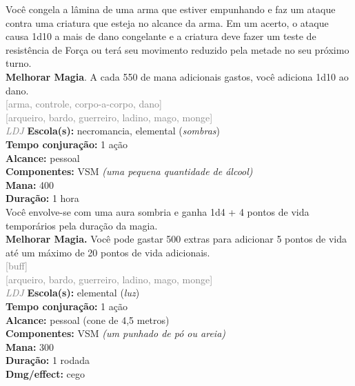 \documentclass{RPG_Adventure}[2021/10/20]
\begin{document}
{\normalsize Você congela a lâmina de uma arma que estiver empunhando e faz um ataque contra uma criatura que esteja no alcance da arma. Em um acerto, o ataque causa 1d10 a mais de dano congelante e a criatura deve fazer um teste de resistência de Força ou terá seu movimento reduzido pela metade no seu próximo turno.\\\t \textbf{Melhorar Magia}. A cada 550 de mana adicionais gastos, você adiciona 1d10 ao dano.\\}
{\scriptsize \textcolor{gray}{[arma, controle, corpo-a-corpo, dano]\\}}
{\scriptsize \textcolor{gray}{[arqueiro, bardo, guerreiro, ladino, mago, monge]\\}}
{\tiny \textcolor{gray}{\textit{LDJ}}}
{\small \t \textbf{Escola(s):} necromancia, elemental (\textit{sombras})\\\t \textbf{Tempo conjuração:} 1 ação\\\t \textbf{Alcance:} pessoal\\\t \textbf{Componentes:} VSM \textit{(uma pequena quantidade de álcool)}\\\t \textbf{Mana:} 400\\\t \textbf{Duração:} 1 hora\\}
{\normalsize Você envolve-se com uma aura sombria e ganha 1d4 + 4 pontos de vida temporários pela duração da magia.\\\t \textbf{Melhorar Magia.} Você pode gastar 500 extras para adicionar 5 pontos de vida até um máximo de 20 pontos de vida adicionais.\\}
{\scriptsize \textcolor{gray}{[buff]\\}}
{\scriptsize \textcolor{gray}{[arqueiro, bardo, guerreiro, ladino, mago, monge]\\}}
{\tiny \textcolor{gray}{\textit{LDJ}}}
{\small \t \textbf{Escola(s):} elemental (\textit{luz})\\\t \textbf{Tempo conjuração:} 1 ação\\\t \textbf{Alcance:} pessoal (cone de 4,5 metros)\\\t \textbf{Componentes:} VSM \textit{(um punhado de pó ou areia)}\\\t \textbf{Mana:} 300\\\t \textbf{Duração:} 1 rodada\\\t \textbf{Dmg/effect:} cego\\}
\end{document}
